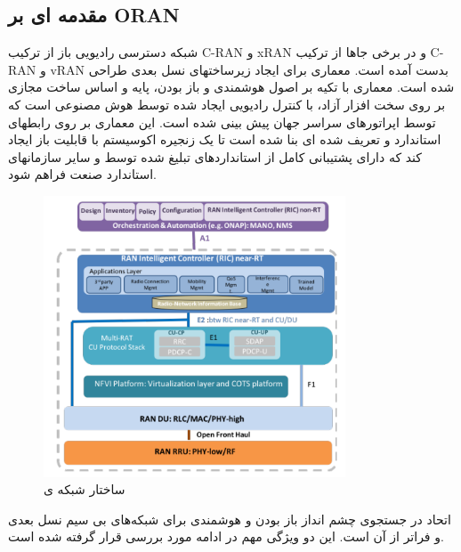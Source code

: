 \subsection{مقدمه ای بر ORAN}
شبکه دسترسی رادیویی باز از ترکیب C-RAN و xRAN و در برخی جاها از ترکیب C-RAN و vRAN بدست آمده است.
معماری  برای ایجاد زیرساختهای  نسل بعدی طراحی شده است.
معماری  با تکیه بر اصول هوشمندی و باز بودن، پایه و اساس ساخت  مجازی بر روی سخت افزار آزاد، با کنترل رادیویی ایجاد شده توسط هوش مصنوعی است که توسط اپراتورهای سراسر جهان پیش بینی شده است.
این معماری بر روی رابطهای استاندارد و تعریف شده ای بنا شده است تا یک زنجیره اکوسیستم با قابلیت باز ایجاد کند که دارای پشتیبانی کامل از استانداردهای تبلیغ شده توسط  و سایر سازمانهای استاندارد صنعت فراهم شود.
\begin{figure}%
  \centering
    \includegraphics[width=0.8\textwidth]{./fig/oran1}
  \caption{ساختار شبکه ی  \cite{oranWP}}
  \label{fig:ORAN}
\end{figure}
اتحاد  در جستجوی چشم انداز باز بودن و هوشمندی برای شبکه‌های بی سیم نسل بعدی و فراتر از آن است\cite{oranWP}.
این دو ویژگی مهم در ادامه مورد بررسی قرار گرفته شده است.
